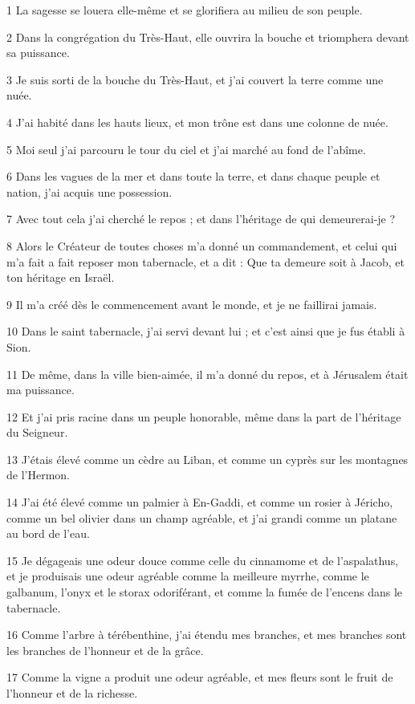 
\par 1 La sagesse se louera elle-même et se glorifiera au milieu de son peuple.
\par 2 Dans la congrégation du Très-Haut, elle ouvrira la bouche et triomphera devant sa puissance.
\par 3 Je suis sorti de la bouche du Très-Haut, et j'ai couvert la terre comme une nuée.
\par 4 J'ai habité dans les hauts lieux, et mon trône est dans une colonne de nuée.
\par 5 Moi seul j'ai parcouru le tour du ciel et j'ai marché au fond de l'abîme.
\par 6 Dans les vagues de la mer et dans toute la terre, et dans chaque peuple et nation, j'ai acquis une possession.
\par 7 Avec tout cela j'ai cherché le repos ; et dans l'héritage de qui demeurerai-je ?
\par 8 Alors le Créateur de toutes choses m'a donné un commandement, et celui qui m'a fait a fait reposer mon tabernacle, et a dit : Que ta demeure soit à Jacob, et ton héritage en Israël.
\par 9 Il m'a créé dès le commencement avant le monde, et je ne faillirai jamais.
\par 10 Dans le saint tabernacle, j'ai servi devant lui ; et c'est ainsi que je fus établi à Sion.
\par 11 De même, dans la ville bien-aimée, il m'a donné du repos, et à Jérusalem était ma puissance.
\par 12 Et j'ai pris racine dans un peuple honorable, même dans la part de l'héritage du Seigneur.
\par 13 J'étais élevé comme un cèdre au Liban, et comme un cyprès sur les montagnes de l'Hermon.
\par 14 J'ai été élevé comme un palmier à En-Gaddi, et comme un rosier à Jéricho, comme un bel olivier dans un champ agréable, et j'ai grandi comme un platane au bord de l'eau.
\par 15 Je dégageais une odeur douce comme celle du cinnamome et de l'aspalathus, et je produisais une odeur agréable comme la meilleure myrrhe, comme le galbanum, l'onyx et le storax odoriférant, et comme la fumée de l'encens dans le tabernacle.
\par 16 Comme l'arbre à térébenthine, j'ai étendu mes branches, et mes branches sont les branches de l'honneur et de la grâce.
\par 17 Comme la vigne a produit une odeur agréable, et mes fleurs sont le fruit de l'honneur et de la richesse.
